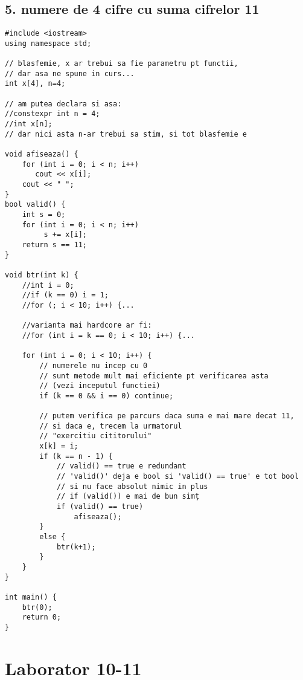 \documentclass[11pt]{article}
\begin{document}
\subsection*{5. numere de 4 cifre cu suma cifrelor 11}
\label{sec:org802e318}
\begin{verbatim}
#include <iostream>
using namespace std;

// blasfemie, x ar trebui sa fie parametru pt functii,
// dar asa ne spune in curs...
int x[4], n=4;

// am putea declara si asa:
//constexpr int n = 4;
//int x[n];
// dar nici asta n-ar trebui sa stim, si tot blasfemie e

void afiseaza() {
    for (int i = 0; i < n; i++)
       cout << x[i];
    cout << " ";
}
bool valid() {
    int s = 0;
    for (int i = 0; i < n; i++)
         s += x[i];
    return s == 11;
}

void btr(int k) {
    //int i = 0;
    //if (k == 0) i = 1;
    //for (; i < 10; i++) {...

    //varianta mai hardcore ar fi:
    //for (int i = k == 0; i < 10; i++) {...

    for (int i = 0; i < 10; i++) {
        // numerele nu incep cu 0
        // sunt metode mult mai eficiente pt verificarea asta
        // (vezi inceputul functiei)
        if (k == 0 && i == 0) continue;

        // putem verifica pe parcurs daca suma e mai mare decat 11,
        // si daca e, trecem la urmatorul
        // "exercitiu cititorului"
        x[k] = i;
        if (k == n - 1) {
            // valid() == true e redundant
            // 'valid()' deja e bool si 'valid() == true' e tot bool
            // si nu face absolut nimic in plus
            // if (valid()) e mai de bun simț
            if (valid() == true)
                afiseaza();
        }
        else {
            btr(k+1);
        }
    }  
}

int main() {
    btr(0);
    return 0;
}
\end{verbatim}

\pagebreak
\section*{Laborator 10-11}
\label{sec:org2cce63c}
\end{document}
